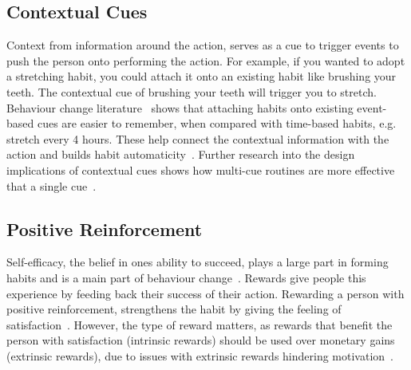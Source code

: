\subsection*{Contextual Cues}
Context from information around the action, serves as a cue to trigger events to push the person onto performing the action. For example, if you wanted to adopt a stretching habit, you could attach it onto an existing habit like brushing your teeth. The contextual cue of brushing your teeth will trigger you to stretch.\newline
\newline
Behaviour change literature~\cite{article_implementation_intentions_multicue} shows that attaching habits onto existing event-based cues are easier to remember, when compared with time-based habits, e.g. stretch every 4 hours. These help connect the contextual information with the action and builds habit automaticity~\cite{article_implementation_intentions}. Further research into the design implications of contextual cues shows how multi-cue routines are more effective that a single cue~\cite{article_understanding_use_contextual_cues_design_impl}.

\subsection*{Positive Reinforcement}
Self-efficacy, the belief in ones ability to succeed, plays a large part in forming habits and is a main part of behaviour change~\cite{article_a_self_efficacy}. Rewards give people this experience by feeding back their success of their action. Rewarding a person with positive reinforcement, strengthens the habit by giving the feeling of satisfaction~\cite{article_promoting_habit_formation}. However, the type of reward matters, as rewards that benefit the person with satisfaction (intrinsic rewards) should be used over monetary gains (extrinsic rewards), due to issues with extrinsic rewards hindering motivation~\cite{article_meta_analytic_review_intrinsic_motivation}.

